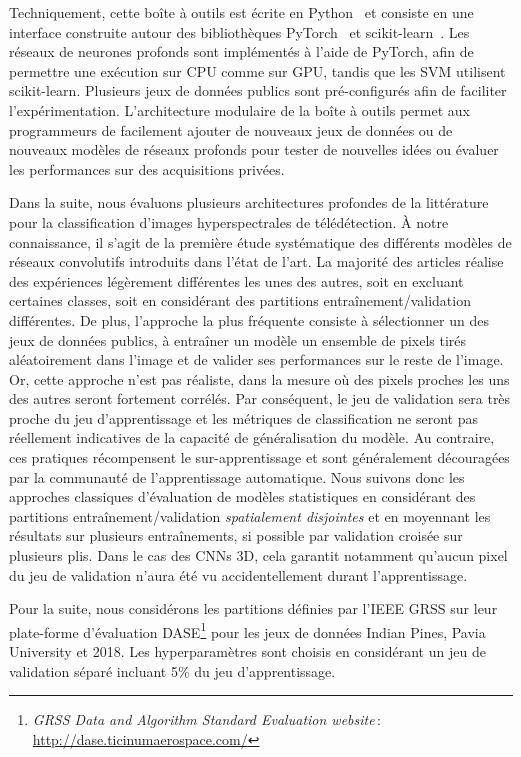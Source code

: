 Techniquement, cette boîte à outils est écrite en Python~\cite{python_software_foundation_python_nodate} et consiste en une interface construite autour des bibliothèques \gls{PyTorch}~\cite{noauthor_pytorch_2016} et \gls{scikit-learn}~\cite{pedregosa_scikit-learn_2011}. Les réseaux de neurones profonds sont implémentés à l'aide de \gls{PyTorch}, afin de permettre une exécution sur \gls{CPU} comme sur \gls{GPU}, tandis que les \gls{SVM} utilisent \gls{scikit-learn}. Plusieurs jeux de données publics sont pré-configurés afin de faciliter l'expérimentation. L'architecture modulaire de la boîte à outils permet aux programmeurs de facilement ajouter de nouveaux jeux de données ou de nouveaux modèles de réseaux profonds pour tester de nouvelles idées ou évaluer les performances sur des acquisitions privées.

Dans la suite, nous évaluons plusieurs architectures profondes de la littérature pour la classification d'images hyperspectrales de télédétection. À notre connaissance, il s'agit de la première étude systématique des différents modèles de réseaux convolutifs introduits dans l'état de l'art. La majorité des articles réalise des expériences légèrement différentes les unes des autres, soit en excluant certaines classes, soit en considérant des partitions entraînement/validation différentes. De plus, l'approche la plus fréquente consiste à sélectionner un des jeux de données publics, à entraîner un modèle un ensemble de pixels tirés aléatoirement dans l'image et de valider ses performances sur le reste de l'image. Or, cette approche n'est pas réaliste, dans la mesure où des pixels proches les uns des autres seront fortement corrélés. Par conséquent, le jeu de validation sera très proche du jeu d'apprentissage et les métriques de classification ne seront pas réellement indicatives de la capacité de généralisation du modèle. Au contraire, ces pratiques récompensent le sur-apprentissage et sont généralement découragées par la communauté de l'apprentissage automatique. Nous suivons donc les approches classiques d'évaluation de modèles statistiques en considérant des partitions entraînement/validation \emph{spatialement disjointes} et en moyennant les résultats sur plusieurs entraînements, si possible par validation croisée sur plusieurs plis. Dans le cas des \glspl{CNN} 3D, cela garantit notamment qu'aucun pixel du jeu de validation n'aura été vu accidentellement durant l'apprentissage.

Pour la suite, nous considérons les partitions définies par l'\gls{IEEE} \gls{GRSS} sur leur plate-forme d'évaluation DASE\footnote{\emph{GRSS Data and Algorithm Standard Evaluation website}\,: \url{http://dase.ticinumaerospace.com/}} pour les jeux de données Indian Pines, Pavia University et  2018. Les hyperparamètres sont choisis en considérant un jeu de validation séparé incluant 5\% du jeu d'apprentissage.

